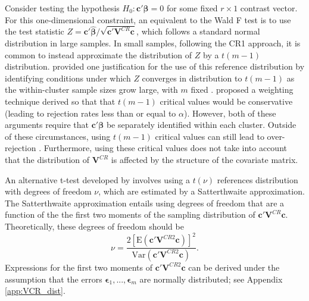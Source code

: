 \documentclass[12pt]{article}\usepackage[]{graphicx}\usepackage[]{color}
\newcommand{\E}{\text{E}}
\newcommand{\Var}{\text{Var}}
\newcommand{\bm}{\mathbf}
\newcommand{\bs}{\boldsymbol}
\begin{document}
Consider testing the hypothesis $H_0: \bm{c}'\bs\beta = 0$ for some fixed $r \times 1$ contrast vector. 
For this one-dimensional constraint, an equivalent to the Wald F test is to use the test statistic $Z = \bm{c}'\bs{\hat\beta} / \sqrt{\bm{c}'\bm{V}^{CR}\bm{c}}$, which follows a standard normal distribution in large samples. 
In small samples, following the CR1 approach, it is common to instead approximate the distribution of $Z$ by a $t(m - 1)$ distribution. 
\citet{Hansen2007asymptotic} provided one justification for the use of this reference distribution by identifying conditions under which $Z$ converges in distribution to $t(m-1)$ as the within-cluster sample sizes grow large, with $m$ fixed \citep[see also][]{Donald2007inference}. 
\citet{Ibragimov2010tstatistic} proposed a weighting technique derived so that that $t(m-1)$ critical values would be conservative (leading to rejection rates less than or equal to $\alpha$).
However, both of these arguments require that $\bm{c}'\bs\beta$ be separately identified within each cluster. 
Outside of these circumstances, using $t(m-1)$ critical values can still lead to over-rejection \citep{Cameron2015practitioners}. 
Furthermore, using these critical values does not take into account that the distribution of $\bm{V}^{CR}$ is affected by the structure of the covariate matrix. 

An alternative t-test developed by \citet{Bell2002bias} involves using a $t(\nu)$ references distribution with degrees of freedom $\nu$, which are estimated by a Satterthwaite approximation.
The Satterthwaite approximation \citep{Satterthwaite1946approximate} entails using degrees of freedom that are a function of the the first two moments of the sampling distribution of $\bm{c}' \bm{V}^{CR} \bm{c}$.
Theoretically, these degrees of freedom should be 
\begin{equation}
\label{eq:nu_Satterthwaite}
\nu = \frac{2\left[\E\left(\bm{c}'\bm{V}^{CR2}\bm{c}\right)\right]^2}{\Var\left(\bm{c}'\bm{V}^{CR2}\bm{c}\right)}.
\end{equation}
Expressions for the first two moments of $\bm{c}'\bm{V}^{CR2}\bm{c}$ can be derived under the assumption that the errors $\bs\epsilon_1,...,\bs\epsilon_m$ are normally distributed; see Appendix \ref{app:VCR_dist}. 
\end{document}
